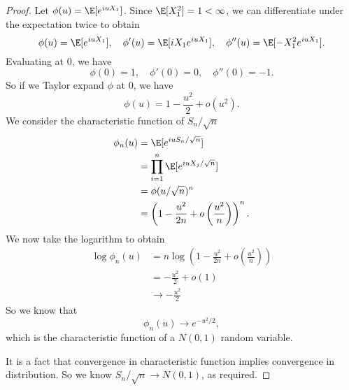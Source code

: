 \documentclass[a4paper]{article}
\begin{document}
\begin{proof}
  Let $\phi(u) = \E[e^{iuX_1}]$. Since $\E[X_1^2] = 1 < \infty$, we can differentiate under the expectation twice to obtain
  \[
    \phi(u) = \E[e^{iuX_1}],\quad \phi'(u) = \E[iX_1 e^{iuX_1}],\quad \phi''(u) = \E[-X_1^2 e^{iuX_1}].
  \]
  Evaluating at $0$, we have
  \[
    \phi(0) = 1,\quad \phi'(0) = 0,\quad \phi''(0) = -1.
  \]
  So if we Taylor expand $\phi$ at $0$, we have
  \[
    \phi(u) = 1 - \frac{u^2}{2} + o(u^2).
  \]
  We consider the characteristic function of $S_n/\sqrt{n}$
  \begin{align*}
    \phi_n(u) &= \E[e^{iuS_n/\sqrt{n}}] \\
    &= \prod_{i = 1}^n \E[e^{iuX_j/\sqrt{n}}] \\
    &= \phi(u/\sqrt{n})^n\\
    &= \left(1 - \frac{u^2}{2n} + o\left(\frac{u^2}{n}\right)\right)^n.
  \end{align*}
  We now take the logarithm to obtain
  \begin{align*}
    \log \phi_n(u) &= n \log\left(1 - \frac{u^2}{2n} + o\left(\frac{u^2}{n}\right)\right)\\
    &= - \frac{u^2}{2} + o(1)\\
    &\to -\frac{u^2}{2}
  \end{align*}
  So we know that
  \[
    \phi_n(u) \to e^{-u^2/2},
  \]
  which is the characteristic function of a $N(0, 1)$ random variable.

  It is a fact that convergence in characteristic function implies convergence in distribution. So we know $S_n/\sqrt{n} \to N(0, 1)$, as required. %
\end{proof}


\printindex
\end{document}
